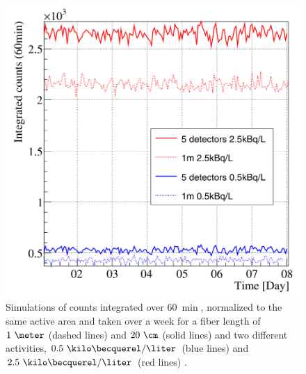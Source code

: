 \begin{figure}[h]
\centering
\includegraphics[scale=0.3]{Figures/8SimulationsResults/81TRITIUMDesign/813Length/2DifferentLength.png}
\caption{Simulations of counts integrated over $60~\min$, normalized to the same active area and taken over a week for a fiber length of $1~\meter$ (dashed lines) and $20~\cm$ (solid lines) and two different activities, $0.5~\kilo\becquerel/\liter$ (blue lines) and $2.5~\kilo\becquerel/\liter$ (red lines) \cite{SimulationPaperCarlos}. \label{fig:CountsOver60minDifferentLength}}
\end{figure}


